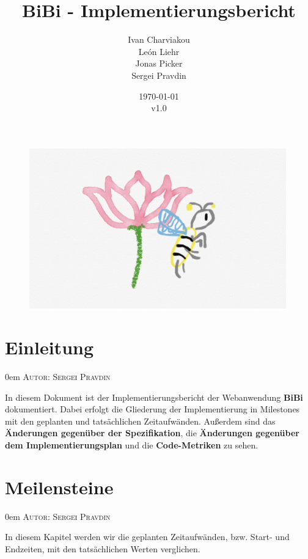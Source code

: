 \documentclass{article}
\title{BiBi - Implementierungsbericht}
\date{\today\\v1.0}
\author{
	Ivan Charviakou\\
	León Liehr\\
	Jonas Picker\\
	Sergei Pravdin
}
\makeatletter
\newcommand{\sectionauthor}[1]{
	{\parindent 0em \large \scshape Autor: #1 \par \nobreak \vspace*{1em}}
	\@afterheading
}
\makeatother
\begin{document}
\maketitle
\begin{figure}[H]
	\centering
	\includegraphics[width = 30em]{Logo}
\end{figure}
\newpage
\tableofcontents
\newpage

\section{Einleitung}
\sectionauthor{Sergei Pravdin}
In diesem Dokument ist der Implementierungsbericht der Webanwendung \textbf{BiBi} dokumentiert. Dabei erfolgt die Gliederung der Implementierung in Milestones mit den geplanten und tatsächlichen Zeitaufwänden. Außerdem sind das \textbf{Änderungen gegenüber der Spezifikation}, die \textbf{Änderungen gegenüber dem Implementierungsplan} und die \textbf{Code-Metriken} zu sehen.


\section{Meilensteine}
\sectionauthor{Sergei Pravdin}
In diesem Kapitel werden wir die geplanten Zeitaufwänden, bzw. Start- und Endzeiten, mit den tatsächlichen Werten verglichen.
\end{document}
